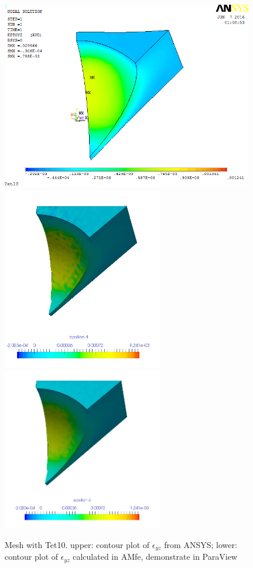 \begin{figure}[htbp]
	\begin{center}
		\includegraphics[width=11cm,clip]{Tet10_Eyz.png} 	
		\includegraphics[width=7cm,clip]{Tet10_Eyz_PD.png} 	
		\includegraphics[width=7cm,clip]{Tet10_Eyz_P.png} 		
		\caption{Mesh with Tet10. upper: contour plot of $\epsilon_{yz}$ from ANSYS; lower: contour plot of $\epsilon_{yz}$ calculated in AMfe, demonstrate in ParaView} \label{fig: Tet10_Eyz}
	\end{center}
\end{figure}
\clearpage 

